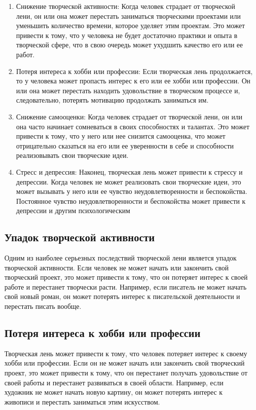 \documentclass[a4paper, 14pt]{article}
\begin{document}
\begin{enumerate}
\item Снижение творческой активности: Когда человек страдает от творческой лени, он или она может перестать заниматься творческими проектами или уменьшить количество времени, которое уделяет этим проектам. Это может привести к тому, что у человека не будет достаточно практики и опыта в творческой сфере, что в свою очередь может ухудшить качество его или ее работ.

\item Потеря интереса к хобби или профессии: Если творческая лень продолжается, то у человека может пропасть интерес к его или ее хобби или профессии. Он или она может перестать находить удовольствие в творческом процессе и, следовательно, потерять мотивацию продолжать заниматься им.

\item Снижение самооценки: Когда человек страдает от творческой лени, он или она часто начинает сомневаться в своих способностях и талантах. Это может привести к тому, что у него или нее снизится самооценка, что может отрицательно сказаться на его или ее уверенности в себе и способности реализовывать свои творческие идеи.

\item Стресс и депрессия: Наконец, творческая лень может привести к стрессу и депрессии. Когда человек не может реализовать свои творческие идеи, это может вызывать у него или ее чувство неудовлетворенности и беспокойства. Постоянное чувство неудовлетворенности и беспокойства может привести к депрессии и другим психологическим 
\end{enumerate}
\subsection{Упадок творческой активности}
Одним из наиболее серьезных последствий творческой лени является упадок творческой активности. Если человек не может начать или закончить свой творческий проект, это может привести к тому, что он потеряет интерес к своей работе и перестанет творчески расти.
Например, если писатель не может начать свой новый роман, он может потерять интерес к писательской деятельности и перестать писать вообще.

\subsection{Потеря интереса к хобби или профессии}
Творческая лень может привести к тому, что человек потеряет интерес к своему хобби или профессии. Если он не может начать или закончить свой творческий проект, это может привести к тому, что он перестанет получать удовольствие от своей работы и перестанет развиваться в своей области.
Например, если художник не может начать новую картину, он может потерять интерес к живописи и перестать заниматься этим искусством.
\end{document}

